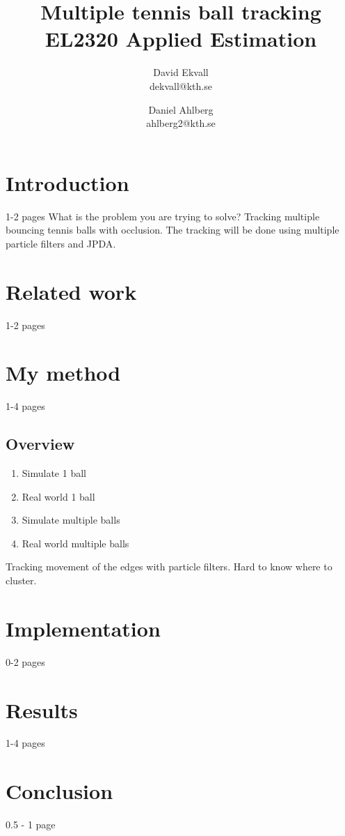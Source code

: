 \documentclass[a4paper,11pt]{article}
\title{
	Multiple tennis ball tracking\\
	EL2320 Applied Estimation
}
\author{
	David Ekvall\\
	dekvall@kth.se\\
	\and
	Daniel Ahlberg\\
	ahlberg2@kth.se\\
}
\begin{document}
\maketitle
{}

\section{Introduction}
1-2 pages
What is the problem you are trying to solve?
Tracking multiple bouncing tennis balls with occlusion. The tracking will be done using multiple particle filters and JPDA\cite{jaward2006multiple}.

\section{Related work}
1-2 pages \cite{reed2016generative}

\section{My method}
1-4 pages
\subsection{Overview}
\begin{enumerate}
	\item Simulate 1 ball
	\item Real world 1 ball
	\item Simulate multiple balls
	\item Real world multiple balls
\end{enumerate}


Tracking movement of the edges with particle filters. Hard to know where to cluster. 

\section{Implementation}
0-2 pages

\section{Results}
1-4 pages

\section{Conclusion}
0.5 - 1 page

\printbibliography
\end{document}
